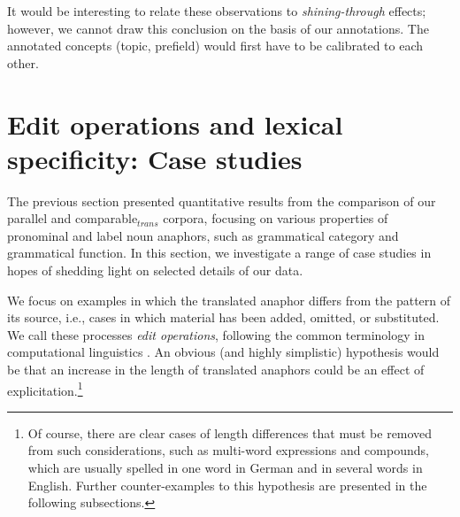 \documentclass[output=paper]{LSP/langsci}
\begin{document}
It would be interesting to relate these observations to \emph{shining-through} effects; however, we cannot draw this conclusion on the basis of our annotations. The annotated concepts (topic, prefield) would first have to be calibrated to each other.

 

%

\section{Edit operations and lexical specificity: Case studies}
\label{sec:case}
%
%
%
%
%
%

The previous section presented quantitative results from the comparison of  our parallel and comparable$_{trans}$ corpora, focusing on various properties of pronominal and label noun anaphors, such as grammatical category and grammatical function. In this section, we investigate a range of case studies in hopes of shedding light on selected details of our data. 

\largerpage[-2]
We focus on examples in which the translated anaphor differs from the pattern of its source, i.e., cases in which material has been added, omitted, or substituted. We call these processes \textit{edit operations}, following the common terminology in computational linguistics \citep{levenshtein1965}. An obvious (and highly simplistic) hypothesis would be that an increase in the length of translated anaphors could be an effect of explicitation.\footnote{Of course, there are clear cases of length differences that  must be removed from such considerations, such as multi-word expressions and compounds, which are usually spelled in one word in German and in several words in English. Further counter-examples to this hypothesis are presented in the following subsections.}
\end{document}
